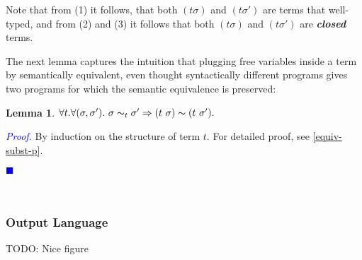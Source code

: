 \documentclass[a4paper,11pt,oneside]{article}
\theoremstyle{plain}
\newtheorem{lemma}[definition]{Lemma}
\renewenvironment{proof}{\noindent \textcolor{blue}{\textit{Proof.}}}
{{\begin{tiny}\textcolor{blue}{$\blacksquare$}\end{tiny}}\\}
\newcommand{\tmapp}[2]{(#1 ~ #2)}
\newcommand{\eqvsbst}[2]{#1 \thicksim_{#2} #1'}
\begin{document}
	Note that from (1) it follows, that both $(t\sigma)$ and 
	$(t\sigma')$ are terms that well-typed, and from (2) and (3) it follows 
	that both $(t\sigma)$ and	 $(t\sigma')$ are \textit{\textbf{closed}} terms.
	
	The next lemma captures the intuition that plugging free variables
        inside a term by semantically equivalent, even thought syntactically
        different programs gives two programs for which the semantic
        equivalence is preserved:
	
	\begin{lemma} 
		$\forall t. \forall (\sigma, \sigma'). ~\eqvsbst{\sigma}{t}
		\Rightarrow \tmapp{t}{\sigma} \thicksim \tmapp{t}{\sigma'}.$ 
	\label{equiv-subst-l}
	\end{lemma}

	\begin{proof}
		By induction on the structure of term $t$. For detailed proof, see
		\ref{equiv-subst-p}.
	\end{proof}





\subsubsection*{Output Language}
TODO: Nice figure 



% 
% 
% 
\end{document}
